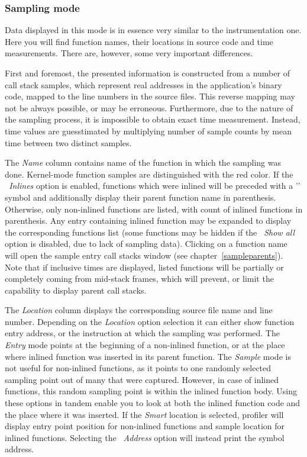 \documentclass[hidelinks,titlepage,a4paper]{article}
\begin{document}
\subsubsection{Sampling mode}
\label{statisticssampling}

Data displayed in this mode is in essence very similar to the instrumentation one. Here you will find function names, their locations in source code and time measurements. There are, however, some very important differences.

First and foremost, the presented information is constructed from a number of call stack samples, which represent real addresses in the application's binary code, mapped to the line numbers in the source files. This reverse mapping may not be always possible, or may be erroneous. Furthermore, due to the nature of the sampling process, it is impossible to obtain exact time measurement. Instead, time values are guesstimated by multiplying number of sample counts by mean time between two distinct samples.

The \emph{Name} column contains name of the function in which the sampling was done. Kernel-mode function samples are distinguished with the red color. If the \emph{\faSitemap{}~Inlines} option is enabled, functions which were inlined will be preceded with a '\faCaretRight{}' symbol and additionally display their parent function name in parenthesis. Otherwise, only non-inlined functions are listed, with count of inlined functions in parenthesis. Any entry containing inlined function may be expanded to display the corresponding functions list (some functions may be hidden if the \emph{\faPuzzlePiece{}~Show all} option is disabled, due to lack of sampling data). Clicking on a function name will open the sample entry call stacks window (see chapter~\ref{sampleparents}). Note that if inclusive times are displayed, listed functions will be partially or completely coming from mid-stack frames, which will prevent, or limit the capability to display parent call stacks.

The \emph{Location} column displays the corresponding source file name and line number. Depending on the \emph{Location} option selection it can either show function entry address, or the instruction at which the sampling was performed. The \emph{Entry} mode points at the beginning of a non-inlined function, or at the place where inlined function was inserted in its parent function. The \emph{Sample} mode is not useful for non-inlined functions, as it points to one randomly selected sampling point out of many that were captured. However, in case of inlined functions, this random sampling point is within the inlined function body. Using these options in tandem enable you to look at both the inlined function code and the place where it was inserted. If the \emph{Smart} location is selected, profiler will display entry point position for non-inlined functions and sample location for inlined functions. Selecting the \emph{\faAt{}~Address} option will instead print the symbol address.
\end{document}
